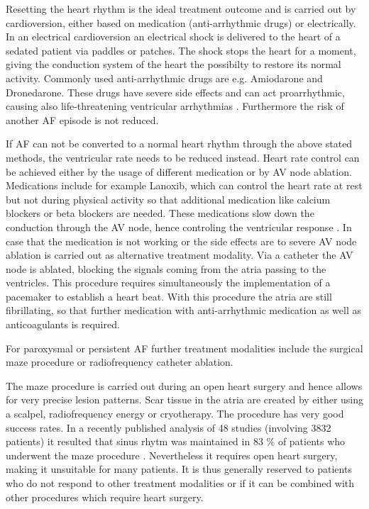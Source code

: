\documentclass[type=dr, dr=rernat, accentcolor=tud7b,colorbacktitle, bigchapter, openright, twoside, 12pt ]{tudthesis}
\begin{document}
Resetting the heart rhythm is the ideal treatment outcome and is carried out by cardioversion, either based on medication (anti-arrhythmic 
drugs) or electrically. In an electrical cardioversion an electrical shock is delivered to the heart of a sedated patient via paddles or 
patches. The shock stops the heart for a moment, giving the conduction system of the heart the possibilty to restore its normal activity. 
Commonly used anti-arrhythmic drugs are e.g. Amiodarone and Dronedarone. These drugs have severe side effects and can act proarrhythmic, 
causing also life-threatening ventricular arrhythmias \cite{Mayo}. Furthermore the risk of another AF episode is not reduced.\newline

If AF can not be converted to a normal heart rhythm through the above stated methods, the ventricular rate needs to be reduced instead. 
Heart rate control can be achieved either by the usage of different medication or by AV node ablation. Medications include for example 
Lanoxib, which can control the heart rate at rest but not during physical activity so that additional medication like calcium blockers or 
beta blockers are needed. These medications slow down the conduction through the AV node, hence controling the ventricular response \cite{ACC06}. 
In case that the medication is not working or the side effects are to severe AV node ablation is carried out as 
alternative treatment modality. Via a catheter the AV node is ablated, blocking the signals coming from the atria passing to the ventricles. 
This procedure requires simultaneously the implementation of a pacemaker to establish a heart beat. With this procedure the atria are still 
fibrillating, so that further medication with anti-arrhythmic medication as well as anticoagulants is required.\newline

For paroxysmal or persistent AF further treatment modalities include the surgical maze procedure or radiofrequency catheter ablation.\newline

The maze procedure is carried out during an open heart surgery and hence allows for very precise lesion patterns. Scar tissue in the atria 
are created by either using a scalpel, radiofrequency energy or cryotherapy. The procedure has very good success rates. In a recently 
published analysis of 48 studies (involving 3832 patients) it resulted that sinus rhytm was maintained in 83 \% of patients who underwent 
the maze procedure \cite{CE09} \cite{Kha05}. Nevertheless it requires open heart surgery, making it unsuitable for many patients. It is 
thus generally reserved to patients who do not respond to other treatment modalities or if it can be combined with other procedures which 
require heart surgery. \newline
\end{document}
